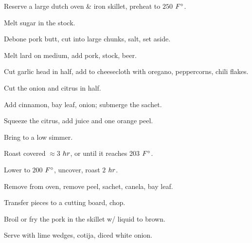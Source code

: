 \begin{preparation}
\item Reserve a large dutch oven \& iron skillet, preheat to $250$ $\Fahrenheit$.
\item Melt sugar in the stock.
\item Debone pork butt, cut into large chunks, salt, set aside.
\item Melt lard on medium, add pork, stock, beer.
\item Cut garlic head in half, add to cheesecloth with oregano, peppercorns,
    chili flakes.
\item Cut the onion and citrus in half.
\item Add cinnamon, bay leaf, onion; submerge the sachet.
\item Squeeze the citrus, add juice and one orange peel.
\item Bring to a low simmer.
\item Roast covered $\approx3$ $\hour$, or until it reaches 203 $\Fahrenheit$.
\item Lower to $200$ $\Fahrenheit$, uncover, roast $2$ $\hour$.
\item Remove from oven, remove peel, sachet, canela, bay leaf.
\item Transfer pieces to a cutting board, chop.
\item Broil or fry the pork in the skillet w/ liquid to brown.
\item Serve with lime wedges, cotija, diced white onion.
\end{preparation}

\recipeend%
